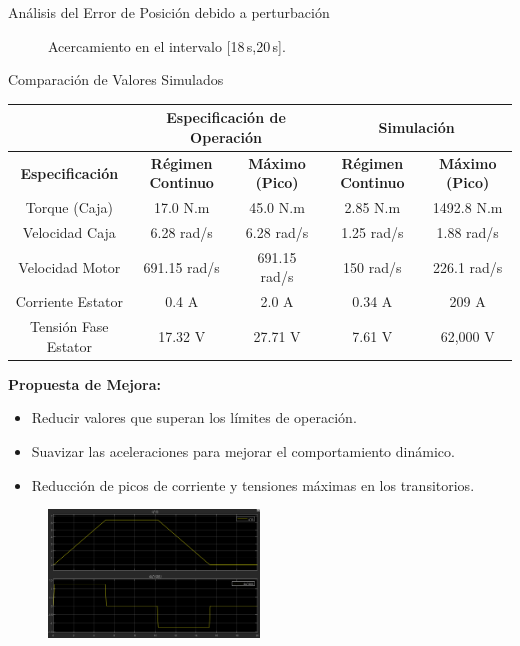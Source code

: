\documentclass[12pt]{beamer}
\begin{document}
\begin{frame}{Análisis del Error de Posición debido a perturbación}
\begin{figure}
\begin{minipage}{0.48\textwidth}
            \caption{Acercamiento en el intervalo [18\,s,20\,s].}
            \label{fig:AcercamientoErrorPosicionPerturbacion}
        \end{minipage}
    \end{figure}
\end{frame}

\begin{frame}{Comparación de Valores Simulados}
    \begin{table}
        \centering
        \fontsize{7pt}{6pt}\selectfont
        \label{tab:specifications}
        \begin{tabular}{|c|c|c|c|c|}
            \hline
             & \multicolumn{2}{|c|}{\textbf{Especificación de Operación}} & \multicolumn{2}{|c|}{\textbf{Simulación}} \\ \hline
            \textbf{Especificación} & \textbf{Régimen Continuo} & \textbf{Máximo (Pico)} & \textbf{Régimen Continuo} & \textbf{Máximo (Pico)} \\ \hline
            Torque (Caja) & 17.0 N.m & 45.0 N.m & 2.85 N.m & 1492.8 N.m \\ \hline
            Velocidad Caja & 6.28 rad/s & 6.28 rad/s & 1.25 rad/s & 1.88 rad/s \\ \hline
            Velocidad Motor & 691.15 rad/s & 691.15 rad/s & 150 rad/s & 226.1 rad/s \\ \hline
            Corriente Estator & 0.4 A & 2.0 A & 0.34 A & 209 A \\ \hline
            Tensión Fase Estator & 17.32 V & 27.71 V & 7.61 V & 62,000 V \\ \hline
        \end{tabular}
    \end{table}
    \textbf{\small Propuesta de Mejora:}
    \begin{itemize}\small
        \item Reducir valores que superan los límites de operación.
        \item Suavizar las aceleraciones para mejorar el comportamiento dinámico.
        \item Reducción de picos de corriente y tensiones máximas en los transitorios.
    \end{itemize}

    \begin{figure}
        \centering
        \includegraphics[width=0.5\textwidth]{Imagenes/perfil_trapezoidal_velocidad.png}
\label{fig:perfil_trapezoidal_velocidad}
    \end{figure}
\end{frame}
\end{document}
